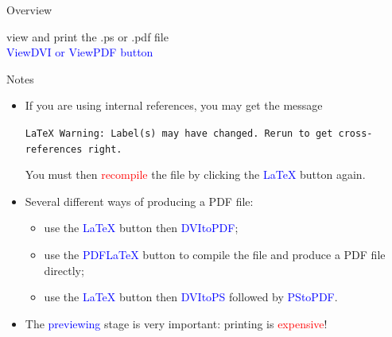 \documentclass{beamer}
\newcommand{\bc}{\begin{center}}
\newcommand{\ec}{\end{center}}
\newcommand{\bi}{\begin{itemize}}
\newcommand{\ei}{\end{itemize}}
\newcommand{\lx}{{\LaTeX} }
\def\mynormal{\vspace*{-0.5cm}}
\begin{document}
\begin{frame}{Overview}
\begin{center}
\end{center}
\vspace{-0.7cm}
\bc
view and print the .ps or .pdf file\\
\textcolor{blue}{ViewDVI or ViewPDF button}
\ec
\end{frame}
\begin{frame}{Notes}
\mynormal
\medskip
\begin{itemize}
\item If you are using internal references, you may get the message
\begin{flushleft}
\texttt{LaTeX Warning: Label(s) may have changed.
Rerun to get cross-references right.}
\end{flushleft}
You must then \textcolor{red}{recompile} the file by clicking the 
\textcolor{blue}{LaTeX} button again.
\pause
\medskip
\item Several different ways of producing a PDF file:
\bi
\item use the \textcolor{blue}{LaTeX} button then 
\textcolor{blue}{DVItoPDF};
\item use the \textcolor{blue}{PDFLaTeX} button to compile the file and 
produce a PDF file directly;
\item use the \textcolor{blue}{LaTeX} button then \textcolor{blue}{DVItoPS} 
followed by \textcolor{blue}{PStoPDF}.
\ei
\pause
\medskip
\item The \textcolor{blue}{previewing} stage is very important: printing is
\textcolor{red}{expensive}!

\end{itemize}
\end{frame}
\end{document}
